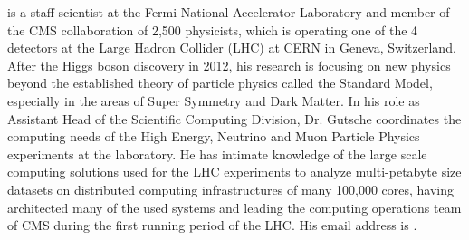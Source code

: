 \documentclass{wscpaperproc}
\theoremstyle{wsc}
\begin{document}
 is a staff scientist at the Fermi National Accelerator Laboratory and member of the CMS collaboration of 2,500 physicists, which is operating one of the 4 detectors at the Large Hadron Collider (LHC) at CERN in Geneva, Switzerland. After the Higgs boson discovery in 2012, his research is focusing on new physics beyond the established theory of particle physics called the Standard Model, especially in the areas of Super Symmetry and Dark Matter. In his role as Assistant Head of the Scientific Computing Division, Dr. Gutsche coordinates the computing needs of the High Energy, Neutrino and Muon Particle Physics experiments at the laboratory. He has intimate knowledge of the large scale computing solutions used for the LHC experiments to analyze multi-petabyte size datasets on distributed computing infrastructures of many 100,000 cores, having architected many of the used systems and leading the computing operations team of CMS during the first running period of the LHC. His email address is .\\
\end{document}
